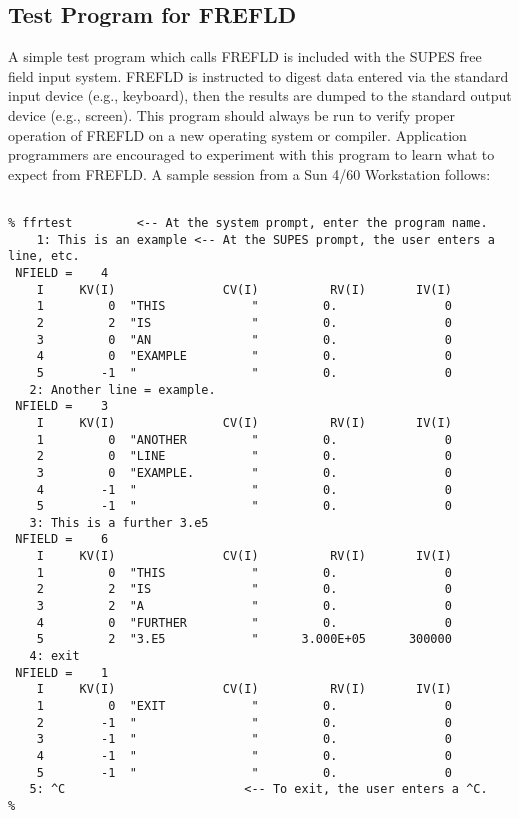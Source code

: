 \subsection{Test Program for FREFLD}
A simple test program which calls FREFLD is included with the SUPES free
field input system.  FREFLD is instructed to digest data entered via the
standard input device (e.g., keyboard), then the results are dumped to the
standard output device (e.g., screen).  This program should always be run to
verify proper operation of FREFLD on a new operating system or compiler.
Application programmers are encouraged to experiment with this program to
learn what to expect from FREFLD.
A sample session from a Sun 4/60 Workstation follows:
\begin{verbatim}

% ffrtest         <-- At the system prompt, enter the program name.
    1: This is an example <-- At the SUPES prompt, the user enters a line, etc.
 NFIELD =    4
    I     KV(I)               CV(I)          RV(I)       IV(I)
    1         0  "THIS            "         0.               0
    2         2  "IS              "         0.               0
    3         0  "AN              "         0.               0
    4         0  "EXAMPLE         "         0.               0
    5        -1  "                "         0.               0
   2: Another line = example.
 NFIELD =    3
    I     KV(I)               CV(I)          RV(I)       IV(I)
    1         0  "ANOTHER         "         0.               0
    2         0  "LINE            "         0.               0
    3         0  "EXAMPLE.        "         0.               0
    4        -1  "                "         0.               0
    5        -1  "                "         0.               0
   3: This is a further 3.e5
 NFIELD =    6
    I     KV(I)               CV(I)          RV(I)       IV(I)
    1         0  "THIS            "         0.               0
    2         2  "IS              "         0.               0
    3         2  "A               "         0.               0
    4         0  "FURTHER         "         0.               0
    5         2  "3.E5            "      3.000E+05      300000
   4: exit
 NFIELD =    1
    I     KV(I)               CV(I)          RV(I)       IV(I)
    1         0  "EXIT            "         0.               0
    2        -1  "                "         0.               0
    3        -1  "                "         0.               0
    4        -1  "                "         0.               0
    5        -1  "                "         0.               0
   5: ^C                         <-- To exit, the user enters a ^C.
% 
\end{verbatim}

